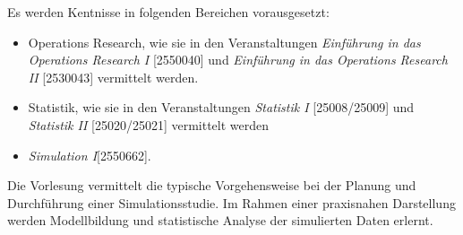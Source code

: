 \begin{course}

\setdoclanguagegerman
{}



\coursehead


\label{cour_7579.dp_997}


\begin{styleenv}
\begin{assessment}

\end{assessment}

\begin{conditions}Es werden Kentnisse in folgenden Bereichen vorausgesetzt:

 \begin{itemize}\item Operations Research, wie sie in den Veranstaltungen \emph{Einführung in das Operations Research I} [2550040] und \emph{Einführung in das Operations Research II} [2530043] vermittelt werden.  \item Statistik, wie sie in den Veranstaltungen \emph{Statistik I} [25008/25009] und \emph{Statistik II} [25020/25021] vermittelt werden  \item \emph{Simulation I}[2550662].  \end{itemize}\end{conditions}


\end{styleenv}

\begin{learningoutcomes}
Die Vorlesung vermittelt die typische Vorgehensweise bei der Planung und Durchführung einer Simulationsstudie. Im Rahmen einer praxisnahen Darstellung werden Modellbildung und statistische Analyse der simulierten Daten erlernt.


\end{learningoutcomes}


\end{course}
